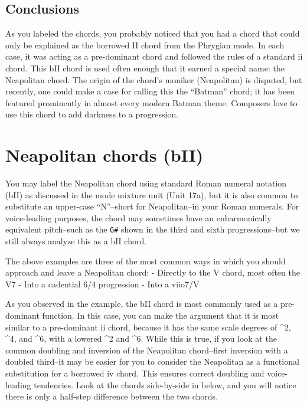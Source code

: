 \documentclass{book}
\begin{document}
\hypertarget{conclusions-31}{%
\subsection{Conclusions}\label{conclusions-31}}

As you labeled the chords, you probably noticed that you had a chord that
could only be explained as the borrowed II chord from the Phrygian mode. In
each case, it was acting as a pre-dominant chord and followed the rules of a
standard ii chord. This bII chord is used often enough that it earned a
special name: the Neapolitan chord. The origin of the chord's moniker
(Neapolitan) is disputed, but recently, one could make a case for calling this
the ``Batman'' chord; it has been featured prominently in almost every modern
Batman theme. Composers love to use this chord to add darkness to a
progression.

\hypertarget{neapolitan-chords-bii}{%
\section{Neapolitan chords (bII)}\label{neapolitan-chords-bii}}

You may label the Neapolitan chord using standard Roman numeral notation (bII)
as discussed in the mode mixture unit (Unit 17a), but it is also common to
substitute an upper-case ``N''--short for Neapolitan--in your Roman numerals.
For voice-leading purposes, the chord may sometimes have an enharmonically
equivalent pitch--such as the \texttt{G\#} shown in the third and sixth
progressions--but we still always analyze this as a bII chord.

The above examples are three of the most common ways in which you should
approach and leave a Neapolitan chord: - Directly to the V chord, most often
the V7 - Into a cadential 6/4 progression - Into a viio7/V

As you observed in the example, the bII chord is most commonly used as a
pre-dominant function. In this case, you can make the argument that it is most
similar to a pre-dominant ii chord, because it has the same scale degrees of
\^{}2, \^{}4, and \^{}6, with a lowered \^{}2 and \^{}6. While this is true,
if you look at the common doubling and inversion of the Neapolitan
chord--first inversion with a doubled third--it may be easier for you to
consider the Neapolitan as a functional substitution for a borrowed iv chord.
This ensures correct doubling and voice-leading tendencies. Look at the chords
side-by-side in below, and you will notice there is only a half-step
difference between the two chords.
\end{document}
